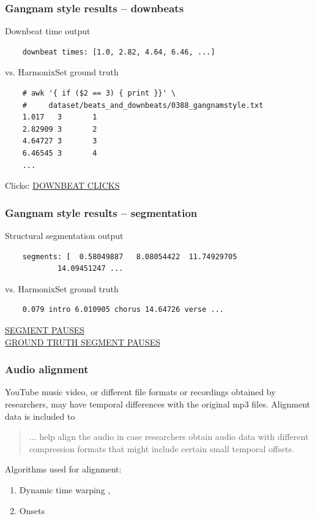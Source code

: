 \documentclass{beamer}
\begin{document}
\begin{frame}[fragile]
	\frametitle{Gangnam style results -- downbeats}
	Downbeat time output
	\begin{verbatim}
	downbeat times: [1.0, 2.82, 4.64, 6.46, ...]
	\end{verbatim}
	vs. HarmonixSet ground truth
	\begin{verbatim}
	# awk '{ if ($2 == 3) { print }}' \
	#     dataset/beats_and_downbeats/0388_gangnamstyle.txt
	1.017   3       1
	2.82909 3       2
	4.64727 3       3
	6.46545 3       4
	...
	\end{verbatim}
	Clicks: \href{run:./gangnam_downbeats.wav}{DOWNBEAT CLICKS}
\end{frame}


\begin{frame}[fragile]
	\frametitle{Gangnam style results -- segmentation}
	Structural segmentation output
	\begin{verbatim}
	segments: [  0.58049887   8.08054422  11.74929705 
            14.09451247 ...
	\end{verbatim}
	vs. HarmonixSet ground truth
	\begin{verbatim}
	0.079 intro 6.010905 chorus 14.64726 verse ...
	\end{verbatim}
	\href{run:./gangnam_segments.wav}{SEGMENT PAUSES}\\
	\href{run:./gangnam_segments_truth.wav}{GROUND TRUTH SEGMENT PAUSES}
\end{frame}


\begin{frame}
	\frametitle{Audio alignment}
	YouTube music video, or different file formats or recordings obtained by researchers, may have temporal differences with the original mp3 files. Alignment data is included to
	\begin{quote}
	... help align the audio in case researchers obtain audio data with different compression formats that might include certain small temporal offsets.
	\end{quote}
	Algorithms used for alignment:
	\begin{enumerate}
		\item
			Dynamic time warping , 
		\item
			Onsets 
	\end{enumerate}
\end{frame}
\end{document}
